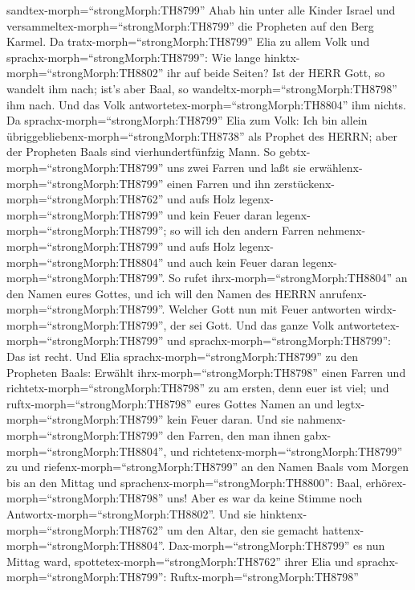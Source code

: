 sandtex-morph=``strongMorph:TH8799'' Ahab hin unter alle Kinder Israel
und versammeltex-morph=``strongMorph:TH8799'' die Propheten auf den Berg
Karmel.  Da tratx-morph=``strongMorph:TH8799'' Elia zu
allem Volk und sprachx-morph=``strongMorph:TH8799'': Wie lange
hinktx-morph=``strongMorph:TH8802'' ihr auf beide Seiten? Ist der HERR
Gott, so wandelt ihm nach; ist's aber Baal, so
wandeltx-morph=``strongMorph:TH8798'' ihm nach. Und das Volk
antwortetex-morph=``strongMorph:TH8804'' ihm nichts.  Da
sprachx-morph=``strongMorph:TH8799'' Elia zum Volk: Ich bin allein
übriggebliebenx-morph=``strongMorph:TH8738'' als Prophet des HERRN; aber
der Propheten Baals sind vierhundertfünfzig Mann.  So
gebtx-morph=``strongMorph:TH8799'' uns zwei Farren und laßt sie
erwählenx-morph=``strongMorph:TH8799'' einen Farren und ihn
zerstückenx-morph=``strongMorph:TH8762'' und aufs Holz
legenx-morph=``strongMorph:TH8799'' und kein Feuer daran
legenx-morph=``strongMorph:TH8799''; so will ich den andern Farren
nehmenx-morph=``strongMorph:TH8799'' und aufs Holz
legenx-morph=``strongMorph:TH8804'' und auch kein Feuer daran
legenx-morph=``strongMorph:TH8799''.  So rufet
ihrx-morph=``strongMorph:TH8804'' an den Namen eures Gottes, und ich
will den Namen des HERRN anrufenx-morph=``strongMorph:TH8799''. Welcher
Gott nun mit Feuer antworten wirdx-morph=``strongMorph:TH8799'', der sei
Gott. Und das ganze Volk antwortetex-morph=``strongMorph:TH8799'' und
sprachx-morph=``strongMorph:TH8799'': Das ist recht.  Und
Elia sprachx-morph=``strongMorph:TH8799'' zu den Propheten Baals:
Erwählt ihrx-morph=``strongMorph:TH8798'' einen Farren und
richtetx-morph=``strongMorph:TH8798'' zu am ersten, denn euer ist viel;
und ruftx-morph=``strongMorph:TH8798'' eures Gottes Namen an und
legtx-morph=``strongMorph:TH8799'' kein Feuer daran.  Und
sie nahmenx-morph=``strongMorph:TH8799'' den Farren, den man ihnen
gabx-morph=``strongMorph:TH8804'', und
richtetenx-morph=``strongMorph:TH8799'' zu und
riefenx-morph=``strongMorph:TH8799'' an den Namen Baals vom Morgen bis
an den Mittag und sprachenx-morph=``strongMorph:TH8800'': Baal,
erhörex-morph=``strongMorph:TH8798'' uns! Aber es war da keine Stimme
noch Antwortx-morph=``strongMorph:TH8802''. Und sie
hinktenx-morph=``strongMorph:TH8762'' um den Altar, den sie gemacht
hattenx-morph=``strongMorph:TH8804''. 
Dax-morph=``strongMorph:TH8799'' es nun Mittag ward,
spottetex-morph=``strongMorph:TH8762'' ihrer Elia und
sprachx-morph=``strongMorph:TH8799'': Ruftx-morph=``strongMorph:TH8798''
